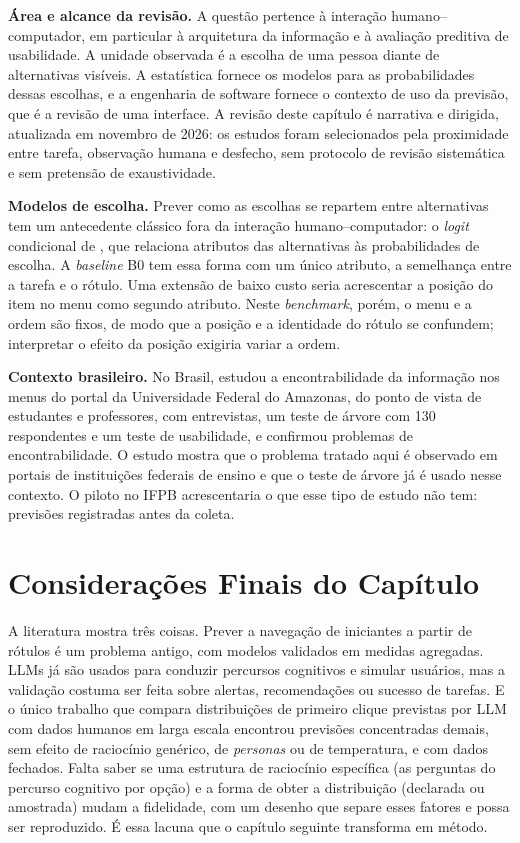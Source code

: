 \documentclass[12pt,oneside,a4paper,chapter=TITLE,english,brazil]{abntex2}
\begin{document}
\textbf{Área e alcance da revisão.} A questão pertence à interação humano--computador, em particular à arquitetura da informação e à avaliação preditiva de usabilidade. A unidade observada é a escolha de uma pessoa diante de alternativas visíveis. A estatística fornece os modelos para as probabilidades dessas escolhas, e a engenharia de software fornece o contexto de uso da previsão, que é a revisão de uma interface. A revisão deste capítulo é narrativa e dirigida, atualizada em novembro de 2026: os estudos foram selecionados pela proximidade entre tarefa, observação humana e desfecho, sem protocolo de revisão sistemática e sem pretensão de exaustividade.

\textbf{Modelos de escolha.} Prever como as escolhas se repartem entre alternativas tem um antecedente clássico fora da interação humano--computador: o \textit{logit} condicional de , que relaciona atributos das alternativas às probabilidades de escolha. A \textit{baseline} B0 tem essa forma com um único atributo, a semelhança entre a tarefa e o rótulo. Uma extensão de baixo custo seria acrescentar a posição do item no menu como segundo atributo. Neste \textit{benchmark}, porém, o menu e a ordem são fixos, de modo que a posição e a identidade do rótulo se confundem; interpretar o efeito da posição exigiria variar a ordem.

\textbf{Contexto brasileiro.} No Brasil,  estudou a encontrabilidade da informação nos menus do portal da Universidade Federal do Amazonas, do ponto de vista de estudantes e professores, com entrevistas, um teste de árvore com 130 respondentes e um teste de usabilidade, e confirmou problemas de encontrabilidade. O estudo mostra que o problema tratado aqui é observado em portais de instituições federais de ensino e que o teste de árvore já é usado nesse contexto. O piloto no IFPB acrescentaria o que esse tipo de estudo não tem: previsões registradas antes da coleta.

\section{Considerações Finais do Capítulo}

A literatura mostra três coisas. Prever a navegação de iniciantes a partir de rótulos é um problema antigo, com modelos validados em medidas agregadas. LLMs já são usados para conduzir percursos cognitivos e simular usuários, mas a validação costuma ser feita sobre alertas, recomendações ou sucesso de tarefas. E o único trabalho que compara distribuições de primeiro clique previstas por LLM com dados humanos em larga escala encontrou previsões concentradas demais, sem efeito de raciocínio genérico, de \textit{personas} ou de temperatura, e com dados fechados. Falta saber se uma estrutura de raciocínio específica (as perguntas do percurso cognitivo por opção) e a forma de obter a distribuição (declarada ou amostrada) mudam a fidelidade, com um desenho que separe esses fatores e possa ser reproduzido. É essa lacuna que o capítulo seguinte transforma em método.
\end{document}
